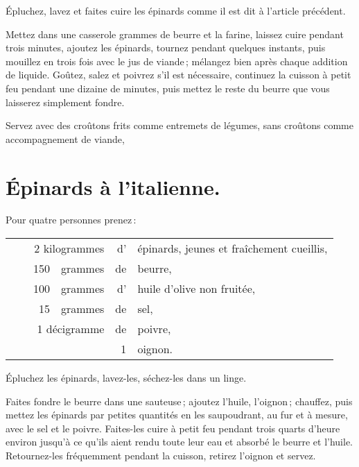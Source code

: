 Épluchez, lavez et faites cuire les épinards comme il est dit à l'article
précédent.

Mettez dans une casserole {\mmm} grammes de beurre et la farine, laissez
cuire pendant trois minutes, ajoutez les épinards, tournez pendant quelques
instants, puis mouillez en trois fois avec le jus de viande ; mélangez bien
après chaque addition de liquide. Goûtez, salez et poivrez s'il est nécessaire,
continuez la cuisson à petit feu pendant une dizaine de minutes, puis mettez le
reste du beurre que vous laisserez simplement fondre.

Servez avec des croûtons frits comme entremets de légumes, sans croûtons
comme accompagnement de viande,

\section*{\centering Épinards à l'italienne.}
{}

Pour quatre personnes prenez :

\footnotesize
\begin{longtable}{rrrrrp{18em}}
  & \multicolumn{3}{r}{2 kilogrammes} & d' & épinards, jeunes et fraîchement cueillis,                    \\
  & \hspace{2em} & 150 & grammes & de & beurre,                                                           \\
  & \hspace{2em} & 100 & grammes & d' & huile d'olive non fruitée,                                        \\
  & \hspace{2em} &  15 & grammes & de & sel,                                                              \\
  & \multicolumn{3}{r}{1 décigramme}  & de & poivre,                                                      \\
  & \hspace{2em} &     &         &  1 & oignon.                                                           \\
\end{longtable}
\normalsize

Épluchez les épinards, lavez-les, séchez-les dans un linge.

Faites fondre le beurre dans une sauteuse ; ajoutez l'huile, l'oignon ;
chauffez, puis mettez les épinards par petites quantités en les saupoudrant, au
fur et à mesure, avec le sel et le poivre. Faites-les cuire à petit feu pendant
trois quarts d'heure environ jusqu'à ce qu'ils aient rendu toute leur eau et
absorbé le beurre et l'huile. Retournez-les fréquemment pendant la cuisson,
retirez l'oignon et servez.

